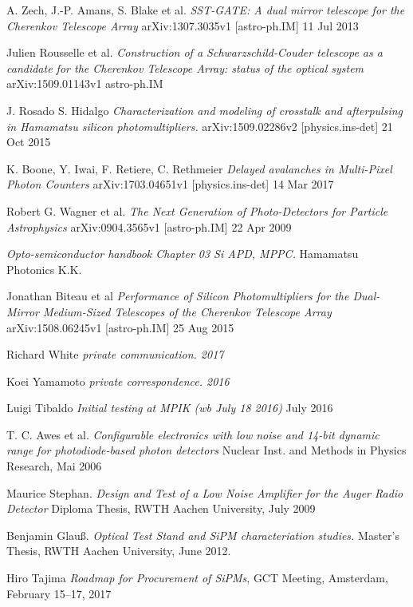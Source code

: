 \documentclass[12pt,article,type=msc,colorback,accentcolor=tud9c]{tudthesis}
\begin{document}
\begin{thebibliography}{12}
 A. Zech, J.-P. Amans, S. Blake et al. \textit{SST-GATE: A dual mirror telescope for the Cherenkov Telescope Array} arXiv:1307.3035v1 [astro-ph.IM] 11 Jul 2013

 Julien Rousselle et al. \textit{Construction of a Schwarzschild-Couder telescope as a candidate for the Cherenkov Telescope Array: status of the optical system}  arXiv:1509.01143v1 astro-ph.IM

 J. Rosado S. Hidalgo \textit{Characterization and modeling of crosstalk and afterpulsing in Hamamatsu silicon photomultipliers.} arXiv:1509.02286v2 [physics.ins-det] 21 Oct 2015

 K. Boone, Y. Iwai, F. Retiere, C. Rethmeier \textit{Delayed avalanches in Multi-Pixel Photon Counters} arXiv:1703.04651v1 [physics.ins-det] 14 Mar 2017

 Robert G. Wagner et al. \textit{The Next Generation of Photo-Detectors for Particle Astrophysics} arXiv:0904.3565v1 [astro-ph.IM] 22 Apr 2009

 \textit{Opto-semiconductor handbook Chapter 03 Si APD, MPPC.} Hamamatsu Photonics K.K.

 Jonathan Biteau et al \textit{Performance of Silicon Photomultipliers for the Dual-Mirror Medium-Sized Telescopes of the Cherenkov Telescope Array} arXiv:1508.06245v1 [astro-ph.IM] 25 Aug 2015

 Richard White \textit{private communication. 2017}

 Koei Yamamoto \textit{private correspondence. 2016}

 Luigi Tibaldo \textit{Initial testing at MPIK (wb July 18 2016)} July 2016

 T. C. Awes et al. \textit{Configurable electronics with low noise and 14-bit dynamic range for photodiode-based photon detectors} Nuclear Inst. and Methods in Physics Research,  Mai 2006

 Maurice Stephan. \textit{Design and Test of a Low Noise Amplifier for the Auger Radio Detector} Diploma Thesis, RWTH Aachen University, July 2009

 Benjamin Glau\ss. \textit{Optical Test Stand and SiPM characteriation studies.} Master's Thesis, RWTH Aachen University, June 2012.

 Hiro Tajima \textit{Roadmap for Procurement of SiPMs}, GCT Meeting, Amsterdam, February 15–17, 2017


\end{thebibliography}
\end{document}
